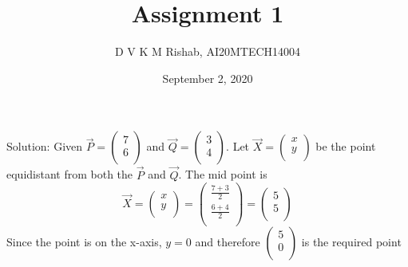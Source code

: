 \documentclass{article}
\title{Assignment 1}
\author{D V K M Rishab, AI20MTECH14004 }
\date{September 2, 2020}
\begin{document}
\maketitle

 Solution: 
  \newline \newline
 Given $\overrightarrow{P} = \begin{pmatrix} 7 \\ 6 \\ \end{pmatrix}$ and $\overrightarrow{Q} = \begin{pmatrix} 3 \\ 4 \\ \end{pmatrix}$. Let $\overrightarrow{X}=\begin{pmatrix} x \\ y \\ \end{pmatrix}$ be the point equidistant from both the $\overrightarrow{P}$ and $\overrightarrow{Q}$. The mid point is 
 \[
 \overrightarrow{X}=\begin{pmatrix} x \\ y \\ \end{pmatrix}=\begin{pmatrix} \frac{7+3}{2} \\ \frac{6+4}{2}
   \\ \end{pmatrix}=\begin{pmatrix} 5 \\ 5 \\ \end{pmatrix}
 \]
 Since the point is on the x-axis, $y=0$ and therefore $\begin{pmatrix} 5 \\ 0 \\ \end{pmatrix}$ is the required point
 
\end{document}
